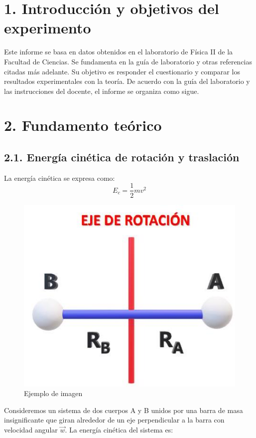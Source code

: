 \documentclass{article}
\begin{document}
\newpage
\section*{1. Introducción y objetivos del experimento}
Este informe se basa en datos obtenidos en el laboratorio de Física II de la Facultad de Ciencias. Se fundamenta en la guía de laboratorio y otras referencias citadas más adelante. Su objetivo es responder el cuestionario y comparar los resultados experimentales con la teoría. De acuerdo con la guía del laboratorio y las instrucciones del docente, el informe se organiza como sigue.


\section*{2. Fundamento teórico}
\subsection*{2.1. Energía cinética de rotación y traslación}
La energía cinética se expresa como:
\begin{equation*}
E_{c} = \frac{1}{2} m v^{2}
\end{equation*}

\begin{figure}[H]
    \centering
        \includegraphics[scale=0.30]{2025_04_01_ea720b93e8ebb5d0c6aeg-03}
    \caption{Ejemplo de imagen}
\end{figure}

Consideremos un sistema de dos cuerpos A y B unidos por una barra de masa insignificante que giran alrededor de un eje perpendicular a la barra con velocidad angular $\vec{w}$. La energía cinética del sistema es:
\end{document}
